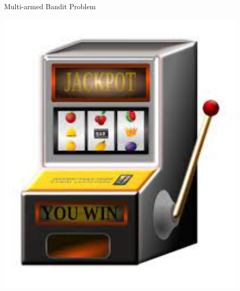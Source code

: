 \documentclass[11pt]{beamer}
\begin{document}
\begin{frame}{Multi-armed Bandit Problem}

\vspace{-1\baselineskip}

\begin{center}
\begin{minipage}{.3\linewidth}
\begin{center}
\includegraphics[width=0.9\textwidth]{images/slotmachine}


\end{center}
\end{minipage}
\end{center}
\end{frame}
\end{document}
